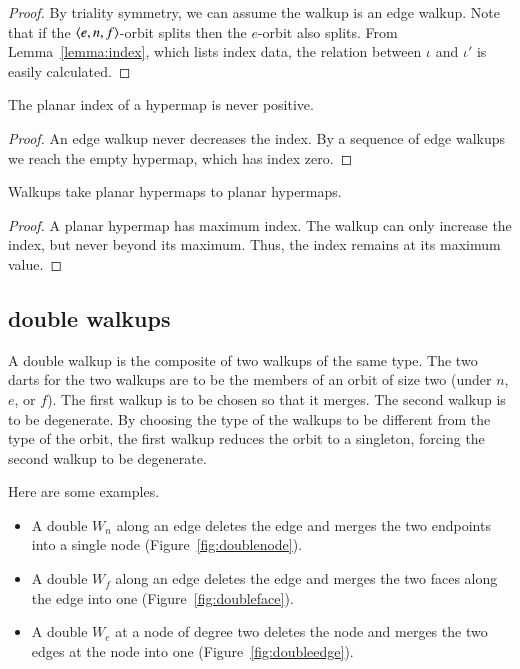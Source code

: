 \begin{proof}  By triality symmetry, 
we can assume the walkup is an edge walkup.  
Note that
if the $\langle e,n,f\rangle$-orbit splits then
the $e$-orbit also splits.
From Lemma~\ref{lemma:index},
which lists index data, the
relation between $\iota$ and $\iota'$ is easily calculated.
\end{proof}


\begin{lemma}  The planar index
of a hypermap is never positive.
\end{lemma}

\begin{proof}  An edge walkup never decreases the index.  By a sequence
of edge walkups we reach the empty hypermap, which has
index zero.
\end{proof}


\begin{lemma} Walkups take planar hypermaps to planar
hypermaps.
\end{lemma}

\begin{proof}  
A planar hypermap has maximum index.  The walkup
can only increase the index, but never beyond its maximum.  
Thus, the index remains at its maximum value.
\end{proof}


\subsection{double walkups}

A double walkup is the composite of two walkups
of the same type.  The
two darts for the two walkups 
are to be the members of an orbit of size
two (under $n$, $e$, or $f$).  The first walkup is to be
chosen so that it merges.  The second walkup is
to be degenerate.
By choosing the type of the walkups to be different from the type of
the orbit, the first walkup reduces the orbit to a singleton,
forcing the second walkup to be degenerate. 
 
Here are some examples.
\begin{itemize}
    \item A double $W_n$ along an edge deletes the edge and 
   merges the two endpoints into
    a single node (Figure~\ref{fig:doublenode}). 
    \item A double $W_f$ along an edge 
    deletes the edge and merges the two faces along the edge into
    one (Figure~\ref{fig:doubleface}).
    \item A double $W_e$ at a node of degree two
    deletes the node and merges the two edges at the node into
    one (Figure~\ref{fig:doubleedge}).
\end{itemize}


